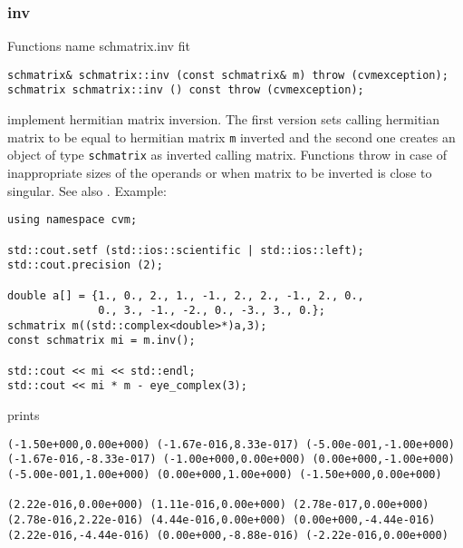 \subsubsection{inv}
Functions%
\pdfdest name {schmatrix.inv} fit
\begin{verbatim}
schmatrix& schmatrix::inv (const schmatrix& m) throw (cvmexception);
schmatrix schmatrix::inv () const throw (cvmexception);
\end{verbatim}
implement hermitian matrix inversion.
The first version sets  calling hermitian matrix to be equal to 
 hermitian matrix \verb"m" inverted and the second one
creates an object of type \verb"schmatrix" as inverted calling matrix.
Functions throw   
in case of inappropriate
sizes of the operands or when  matrix to be inverted is close to
singular.
See also
.
Example:
\begin{Verbatim}
using namespace cvm;

std::cout.setf (std::ios::scientific | std::ios::left); 
std::cout.precision (2);

double a[] = {1., 0., 2., 1., -1., 2., 2., -1., 2., 0.,
              0., 3., -1., -2., 0., -3., 3., 0.};
schmatrix m((std::complex<double>*)a,3);
const schmatrix mi = m.inv();

std::cout << mi << std::endl;
std::cout << mi * m - eye_complex(3);
\end{Verbatim}
prints
\begin{Verbatim}
(-1.50e+000,0.00e+000) (-1.67e-016,8.33e-017) (-5.00e-001,-1.00e+000)
(-1.67e-016,-8.33e-017) (-1.00e+000,0.00e+000) (0.00e+000,-1.00e+000)
(-5.00e-001,1.00e+000) (0.00e+000,1.00e+000) (-1.50e+000,0.00e+000)

(2.22e-016,0.00e+000) (1.11e-016,0.00e+000) (2.78e-017,0.00e+000)
(2.78e-016,2.22e-016) (4.44e-016,0.00e+000) (0.00e+000,-4.44e-016)
(2.22e-016,-4.44e-016) (0.00e+000,-8.88e-016) (-2.22e-016,0.00e+000)
\end{Verbatim}
\newpage



